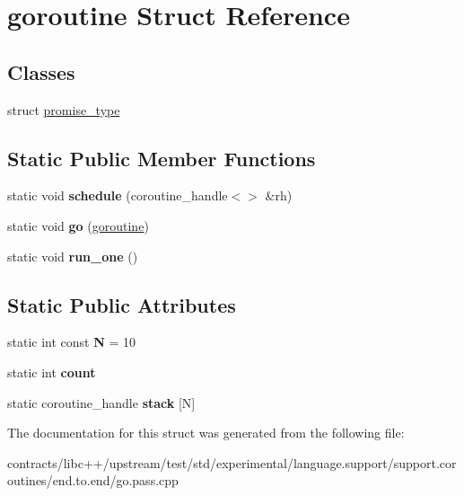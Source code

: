 \hypertarget{structgoroutine}{}\section{goroutine Struct Reference}
\label{structgoroutine}
\subsection*{Classes}
\begin{DoxyCompactItemize}
\item 
struct \mbox{\hyperlink{structgoroutine_1_1promise__type}{promise\+\_\+type}}
\end{DoxyCompactItemize}
\subsection*{Static Public Member Functions}
\begin{DoxyCompactItemize}
\item 
\mbox{\label{structgoroutine_a83c9ca0224005d5822a1da5f11ac2adc}} 
static void {\bfseries schedule} (coroutine\+\_\+handle$<$$>$ \&rh)
\item 
\mbox{\label{structgoroutine_a3e6bc0143458522ddb34a74bd24de2f5}} 
static void {\bfseries go} (\mbox{\hyperlink{structgoroutine}{goroutine}})
\item 
\mbox{\label{structgoroutine_ace495373385aad9977a68c381edee562}} 
static void {\bfseries run\+\_\+one} ()
\end{DoxyCompactItemize}
\subsection*{Static Public Attributes}
\begin{DoxyCompactItemize}
\item 
\mbox{\label{structgoroutine_acfe9eba82b4709ff8dc571b88adadd57}} 
static int const {\bfseries N} = 10
\item 
\mbox{\label{structgoroutine_a1ef3fcae816ab4a26e831d1198f9bcac}} 
static int {\bfseries count}
\item 
\mbox{\label{structgoroutine_afc7d1d24aaa5b2cfbb8d6b0c19d690b4}} 
static coroutine\+\_\+handle {\bfseries stack} \mbox{[}N\mbox{]}
\end{DoxyCompactItemize}


The documentation for this struct was generated from the following file\+:\begin{DoxyCompactItemize}
\item 
contracts/libc++/upstream/test/std/experimental/language.\+support/support.\+coroutines/end.\+to.\+end/go.\+pass.\+cpp\end{DoxyCompactItemize}
